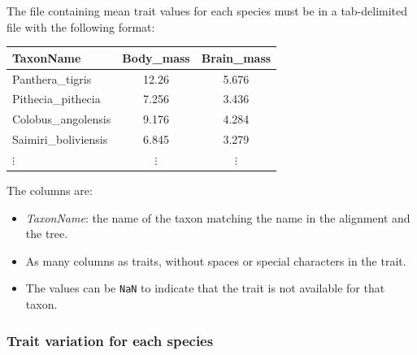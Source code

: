 \documentclass{article}
\providecommand{\DIFdelbegin}{} %
\providecommand{\DIFdelend}{} %
\newcommand{\DIFscaledelfig}{0.5}
\newlength{\DIFdelgraphicswidth} %
\newlength{\DIFdelgraphicsheight} %
\newcommand{\DIFdelincludegraphics}[2][]{%
\sbox{\DIFdelgraphicsbox}{\DIFOincludegraphics[#1]{#2}}%
\settoboxwidth{\DIFdelgraphicswidth}{\DIFdelgraphicsbox} %
\settoboxtotalheight{\DIFdelgraphicsheight}{\DIFdelgraphicsbox} %
\scalebox{\DIFscaledelfig}{%
\parbox[b]{\DIFdelgraphicswidth}{\usebox{\DIFdelgraphicsbox}\\[-\baselineskip] \rule{\DIFdelgraphicswidth}{0em}}\llap{\resizebox{\DIFdelgraphicswidth}{\DIFdelgraphicsheight}{%
\setlength{\unitlength}{\DIFdelgraphicswidth}%
\begin{picture}(1,1)%
\thicklines\linethickness{2pt} %
{\color[rgb]{1,0,0}\put(0,0){\framebox(1,1){}}}%
{\color[rgb]{1,0,0}\put(0,0){\line( 1,1){1}}}%
{\color[rgb]{1,0,0}\put(0,1){\line(1,-1){1}}}%
\end{picture}%
}\hspace*{3pt}}} %
} %
\DeclareRobustCommand{\DIFdelbegin}{\DIFOdelbegin \let\includegraphics\DIFdelincludegraphics} %
\DeclareRobustCommand{\DIFdelend}{\DIFOaddend \let\includegraphics\DIFOincludegraphics} %
\begin{document}
The file containing mean trait values for each species must be in a tab-delimited file with the following format:
\begin{center}
    \begin{adjustbox}{width = 0.35\textwidth}
        \begin{tabular}{|l|c|c|}
            \hline
            TaxonName            & Body\_mass & Brain\_mass \\
            \hline
            Panthera\_tigris     & 12.26      & 5.676       \\
            Pithecia\_pithecia   & 7.256      & 3.436       \\
            Colobus\_angolensis  & 9.176      & 4.284       \\
            Saimiri\_boliviensis & 6.845      & 3.279       \\
            $\vdots$             & $\vdots$   & $\vdots$    \\
            \hline
        \end{tabular}\label{tab:trait-mean}
    \end{adjustbox}
\end{center}

The columns are:
\begin{itemize}
    \item \emph{TaxonName}: the name of the taxon matching the name in the alignment and the tree.
    \item As many columns as traits, without spaces or special characters in the trait.
    \item The values can be \texttt{NaN} to indicate that the trait is not available for that taxon.
\end{itemize}

\newpage
\subsubsection{Trait variation for each species}
\DIFdelbegin %
\DIFdelend 
\end{document}
